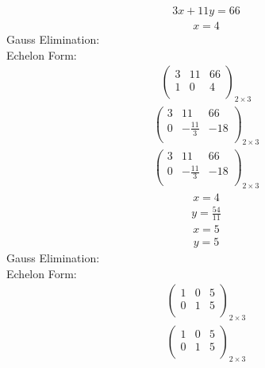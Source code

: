 \documentclass{article}
\begin{document}
\begin{align*}
3x + 11y=66\end{align*}
\begin{align*}
x=4\end{align*}
Gauss Elimination:\\
Echelon Form:\\
\begin{align*}
\left(
\begin{array}{cc|c}
3 & 11 & 66\\
1 & 0 & 4\\
\end{array}
\right)_{2\times 3}
\end{align*}
\begin{align*}
\left(
\begin{array}{cc|c}
3 & 11 & 66\\
0 & -\frac{11}{3} & -18\\
\end{array}
\right)_{2\times 3}
\end{align*}
\begin{align*}
\left(
\begin{array}{cc|c}
3 & 11 & 66\\
0 & -\frac{11}{3} & -18\\
\end{array}
\right)_{2\times 3}
\end{align*}
\begin{align*}
x=4\end{align*}
\begin{align*}
y=\frac{54}{11}\end{align*}
\begin{align*}
x=5\end{align*}
\begin{align*}
y=5\end{align*}
Gauss Elimination:\\
Echelon Form:\\
\begin{align*}
\left(
\begin{array}{cc|c}
1 & 0 & 5\\
0 & 1 & 5\\
\end{array}
\right)_{2\times 3}
\end{align*}
\begin{align*}
\left(
\begin{array}{cc|c}
1 & 0 & 5\\
0 & 1 & 5\\
\end{array}
\right)_{2\times 3}
\end{align*}
\end{document}
